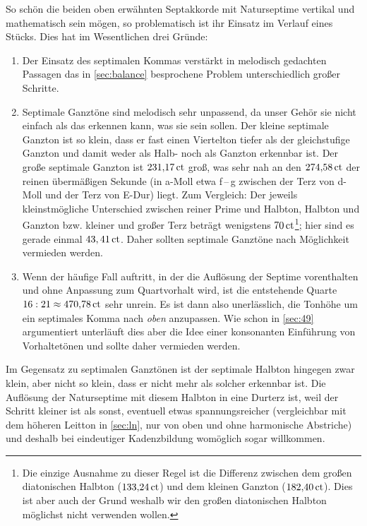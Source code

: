 So schön die beiden oben erwähnten Septakkorde mit Naturseptime vertikal und
mathematisch sein mögen, so problematisch ist ihr Einsatz im Verlauf eines
Stücks. Dies hat im Wesentlichen drei Gründe:
\begin{enumerate}
\item Der Einsatz des septimalen Kommas verstärkt in melodisch gedachten
  Passagen das in \cref{sec:balance} besprochene Problem unterschiedlich großer
  Schritte.
\item Septimale Ganztöne sind melodisch sehr unpassend, da unser Gehör sie nicht
  einfach als das erkennen kann, was sie sein sollen. Der kleine septimale
  Ganzton ist so klein, dass er fast einen Viertelton tiefer als der
  gleichstufige Ganzton und damit weder als Halb- noch als Ganzton erkennbar
  ist. Der große septimale Ganzton ist $231{,}17\,\text{ct}$ groß, was sehr nah an den
  $274{,}58\,\text{ct}$ der reinen übermäßigen Sekunde (in a-Moll etwa \naturalp
  f\,–\,\sharpm g zwischen der Terz von d-Moll und der Terz von E-Dur)
  liegt. Zum Vergleich: Der jeweils kleinstmögliche Unterschied zwischen reiner
  Prime und Halbton, Halbton und Ganzton bzw. kleiner und großer Terz beträgt
  wenigstens $70\,\text{ct}$\footnote{Die einzige Ausnahme zu dieser Regel ist die
    Differenz zwischen dem großen diatonischen Halbton ($133{,}24\,\text{ct}$) und dem
    kleinen Ganzton ($182{,}40\,\text{ct}$). Dies ist aber auch der Grund weshalb wir
    den großen diatonischen Halbton möglichst nicht verwenden wollen.}; hier
  sind es gerade einmal $43,41\,\text{ct}$.  Daher sollten septimale Ganztöne nach
  Möglichkeit vermieden werden.
\item Wenn der häufige Fall auftritt, in der die Auflösung der Septime
  vorenthalten und ohne Anpassung zum Quartvorhalt wird, ist die entstehende
  Quarte $16:21 \approx 470{,}78\,\text{ct}$ sehr unrein.  Es ist dann also
  unerlässlich, die Tonhöhe um ein septimales Komma nach \emph{oben}
  anzupassen. Wie schon in \cref{sec:49} argumentiert unterläuft dies aber die
  Idee einer konsonanten Einführung von Vorhaltetönen und sollte daher vermieden
  werden.
\end{enumerate}
Im Gegensatz zu septimalen Ganztönen ist der septimale Halbton hingegen zwar
klein, aber nicht so klein, dass er nicht mehr als solcher erkennbar ist. Die
Auflösung der Naturseptime mit diesem Halbton in eine Durterz ist, weil der
Schritt kleiner ist als sonst, eventuell etwas spannungsreicher (vergleichbar
mit dem höheren Leitton in \cref{sec:ln}, nur von oben und ohne harmonische
Abstriche) und deshalb bei eindeutiger Kadenzbildung womöglich sogar willkommen.

